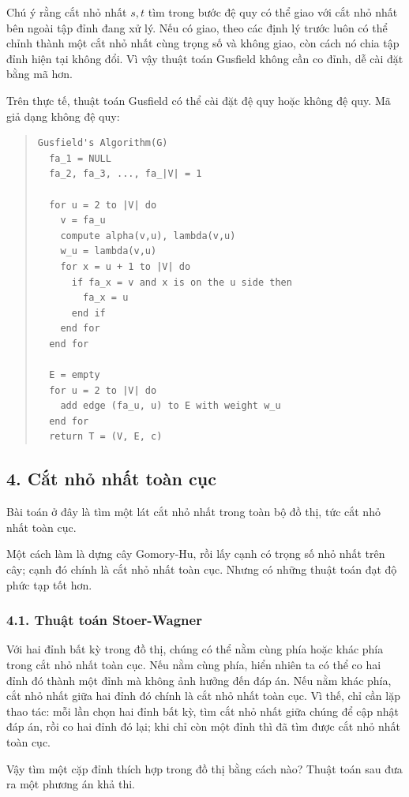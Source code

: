 \documentclass[11pt]{article}
\begin{document}
Chú ý rằng cắt nhỏ nhất \(s,t\) tìm trong bước đệ quy có thể giao với cắt nhỏ
nhất bên ngoài tập đỉnh đang xử lý. Nếu có giao, theo các định lý trước luôn
có thể chỉnh thành một cắt nhỏ nhất cùng trọng số và không giao, còn cách nó
chia tập đỉnh hiện tại không đổi. Vì vậy thuật toán Gusfield không cần co
đỉnh, dễ cài đặt bằng mã hơn.

Trên thực tế, thuật toán Gusfield có thể cài đặt đệ quy hoặc không đệ quy. Mã
giả dạng không đệ quy:
\begin{quote}
\small
\begin{verbatim}
Gusfield's Algorithm(G)
  fa_1 = NULL
  fa_2, fa_3, ..., fa_|V| = 1

  for u = 2 to |V| do
    v = fa_u
    compute alpha(v,u), lambda(v,u)
    w_u = lambda(v,u)
    for x = u + 1 to |V| do
      if fa_x = v and x is on the u side then
        fa_x = u
      end if
    end for
  end for

  E = empty
  for u = 2 to |V| do
    add edge (fa_u, u) to E with weight w_u
  end for
  return T = (V, E, c)
\end{verbatim}
\end{quote}

\subsection*{4. Cắt nhỏ nhất toàn cục}

Bài toán ở đây là tìm một lát cắt nhỏ nhất trong toàn bộ đồ thị, tức cắt nhỏ
nhất toàn cục.

Một cách làm là dựng cây Gomory-Hu, rồi lấy cạnh có trọng số nhỏ nhất trên
cây; cạnh đó chính là cắt nhỏ nhất toàn cục. Nhưng có những thuật toán đạt độ
phức tạp tốt hơn.

\subsubsection*{4.1. Thuật toán Stoer-Wagner}

Với hai đỉnh bất kỳ trong đồ thị, chúng có thể nằm cùng phía hoặc khác phía
trong cắt nhỏ nhất toàn cục. Nếu nằm cùng phía, hiển nhiên ta có thể co hai
đỉnh đó thành một đỉnh mà không ảnh hưởng đến đáp án. Nếu nằm khác phía, cắt
nhỏ nhất giữa hai đỉnh đó chính là cắt nhỏ nhất toàn cục. Vì thế, chỉ cần lặp
thao tác: mỗi lần chọn hai đỉnh bất kỳ, tìm cắt nhỏ nhất giữa chúng để cập
nhật đáp án, rồi co hai đỉnh đó lại; khi chỉ còn một đỉnh thì đã tìm được cắt
nhỏ nhất toàn cục.

Vậy tìm một cặp đỉnh thích hợp trong đồ thị bằng cách nào? Thuật toán sau đưa
ra một phương án khả thi.
\end{document}
